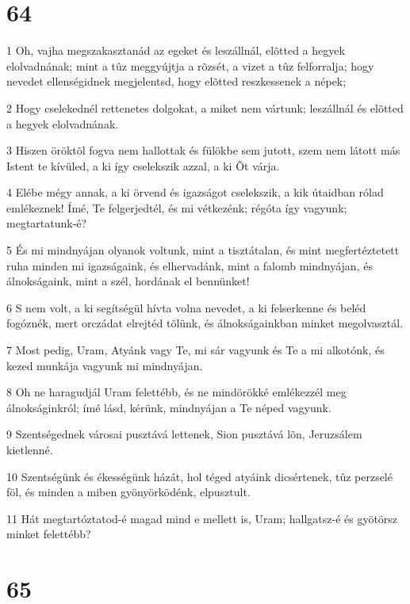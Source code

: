 \chapter{64}

\par 1 Oh, vajha megszakasztanád az egeket és leszállnál, elõtted a hegyek elolvadnának; mint a tûz meggyújtja a rõzsét, a vizet a tûz felforralja; hogy nevedet ellenségidnek megjelentsd, hogy elõtted reszkessenek a népek;
\par 2 Hogy cselekednél rettenetes dolgokat, a miket nem vártunk; leszállnál és elõtted a hegyek elolvadnának.
\par 3 Hiszen öröktõl fogva nem hallottak és fülökbe sem jutott, szem nem látott más Istent te kívüled, a ki így cselekszik azzal, a ki Õt várja.
\par 4 Elébe mégy annak, a ki örvend és igazságot cselekszik, a kik útaidban rólad emlékeznek! Ímé, Te felgerjedtél, és mi vétkezénk; régóta így vagyunk; megtartatunk-é?
\par 5 És mi mindnyájan olyanok voltunk, mint a tisztátalan, és mint megfertéztetett ruha minden mi igazságaink, és elhervadánk, mint a falomb mindnyájan, és álnokságaink, mint a szél, hordának el bennünket!
\par 6 S nem volt, a ki segítségül hívta volna nevedet, a ki felserkenne és beléd fogóznék, mert orczádat elrejtéd tõlünk, és álnokságainkban minket megolvasztál.
\par 7 Most pedig, Uram, Atyánk vagy Te, mi sár vagyunk és Te a mi alkotónk, és kezed munkája vagyunk mi mindnyájan.
\par 8 Oh ne haragudjál Uram felettébb, és ne mindörökké emlékezzél meg álnokságinkról; ímé lásd, kérünk, mindnyájan a Te néped vagyunk.
\par 9 Szentségednek városai pusztává lettenek, Sion pusztává lõn, Jeruzsálem kietlenné.
\par 10 Szentségünk és ékességünk házát, hol téged atyáink dicsértenek, tûz perzselé föl, és minden a miben gyönyörködénk, elpusztult.
\par 11 Hát megtartóztatod-é magad mind e mellett is, Uram; hallgatsz-é és gyötörsz minket felettébb?

\chapter{65}

